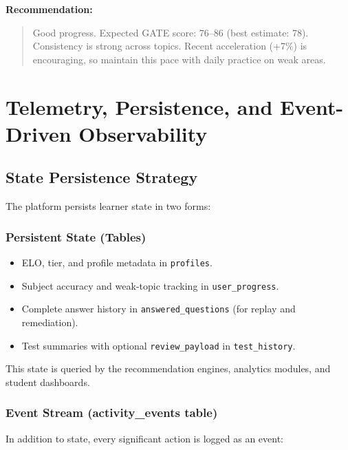 \documentclass[sigconf,authordraft,twoside]{acmart}
\newcommand{\tech}[1]{\textcolor{brandblue}{\nolinkurl{#1}}}
\begin{document}
\textbf{Recommendation:}
\begin{quote}
\footnotesize
Good progress. Expected GATE score: 76--86 (best estimate: 78).
Consistency is strong across topics. Recent acceleration (+7\%) is
encouraging, so maintain this pace with daily practice on weak areas.
\end{quote}

\section{Telemetry, Persistence, and Event-Driven Observability}

\subsection{State Persistence Strategy}

The platform persists learner state in two forms:

\subsubsection{Persistent State (Tables)}
\begin{itemize}
\item ELO, tier, and profile metadata in \tech{profiles}.
\item Subject accuracy and weak-topic tracking in \tech{user\_progress}.
\item Complete answer history in \tech{answered\_questions} (for replay and remediation).
\item Test summaries with optional \tech{review\_payload} in \tech{test\_history}.
\end{itemize}

This state is queried by the recommendation engines, analytics modules, and student dashboards.

\subsubsection{Event Stream (activity\_events table)}
In addition to state, every significant action is logged as an event:
\end{document}
